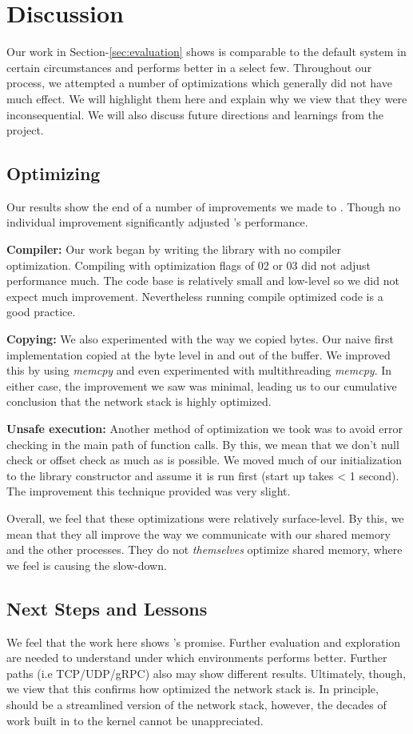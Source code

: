 \section{Discussion}
\label{sec:discussion}
Our work in Section-\ref{sec:evaluation} shows \sysname is comparable to the default system in certain circumstances and performs better in a select few.
Throughout our process, we attempted a number of optimizations which generally did not have much effect.
We will highlight them here and explain why we view that they were inconsequential.
We will also discuss future directions and learnings from the project.

\subsection{Optimizing \sysname}
Our results show the end of a number of improvements we made to \sysname.
Though no individual improvement significantly adjusted \sysname's performance.

\textbf{Compiler:} Our work began by writing the library with no compiler optimization.
Compiling with optimization flags of 02 or 03 did not adjust performance much.
The code base is relatively small and low-level so we did not expect much improvement.
Nevertheless running compile optimized code is a good practice.


\textbf{Copying:} We also experimented with the way we copied bytes.
Our naive first implementation copied at the byte level in and out of the buffer.
We improved this by using \textit{memcpy} and even experimented with multithreading \textit{memcpy}.
In either case, the improvement we saw was minimal, leading us to our cumulative conclusion that the network stack is highly optimized.

\textbf{Unsafe execution:} Another method of optimization we took was to avoid error checking in the main path of function calls.
By this, we mean that we don't null check or offset check as much as is possible.
We moved much of our initialization to the library constructor and assume it is run first (start up takes < 1 second).
The improvement this technique provided was very slight.

Overall, we feel that these optimizations were relatively surface-level.
By this, we mean that they all improve the way we communicate with our shared memory and the other processes.
They do not \textit{themselves} optimize shared memory, where we feel is causing the slow-down.

\subsection{Next Steps and Lessons}
We feel that the work here shows \sysname's promise.
Further evaluation and exploration are needed to understand under which environments \sysname performs better.
Further paths (i.e TCP/UDP/gRPC) also may show different results.
Ultimately, though, we view that this confirms how optimized the network stack is.
In principle, \sysname should be a streamlined version of the network stack, however, the decades of work built in to the kernel cannot be unappreciated.

